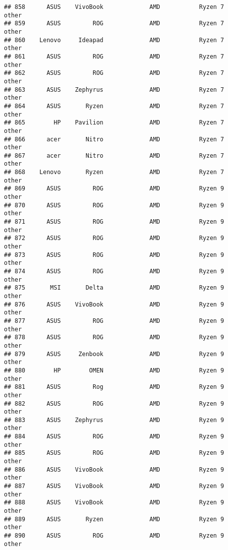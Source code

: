 \documentclass[
]{article}
\begin{document}
\begin{verbatim}
## 858      ASUS    VivoBook             AMD           Ryzen 7           other
## 859      ASUS         ROG             AMD           Ryzen 7           other
## 860    Lenovo     Ideapad             AMD           Ryzen 7           other
## 861      ASUS         ROG             AMD           Ryzen 7           other
## 862      ASUS         ROG             AMD           Ryzen 7           other
## 863      ASUS    Zephyrus             AMD           Ryzen 7           other
## 864      ASUS       Ryzen             AMD           Ryzen 7           other
## 865        HP    Pavilion             AMD           Ryzen 7           other
## 866      acer       Nitro             AMD           Ryzen 7           other
## 867      acer       Nitro             AMD           Ryzen 7           other
## 868    Lenovo       Ryzen             AMD           Ryzen 7           other
## 869      ASUS         ROG             AMD           Ryzen 9           other
## 870      ASUS         ROG             AMD           Ryzen 9           other
## 871      ASUS         ROG             AMD           Ryzen 9           other
## 872      ASUS         ROG             AMD           Ryzen 9           other
## 873      ASUS         ROG             AMD           Ryzen 9           other
## 874      ASUS         ROG             AMD           Ryzen 9           other
## 875       MSI       Delta             AMD           Ryzen 9           other
## 876      ASUS    VivoBook             AMD           Ryzen 9           other
## 877      ASUS         ROG             AMD           Ryzen 9           other
## 878      ASUS         ROG             AMD           Ryzen 9           other
## 879      ASUS     Zenbook             AMD           Ryzen 9           other
## 880        HP        OMEN             AMD           Ryzen 9           other
## 881      ASUS         Rog             AMD           Ryzen 9           other
## 882      ASUS         ROG             AMD           Ryzen 9           other
## 883      ASUS    Zephyrus             AMD           Ryzen 9           other
## 884      ASUS         ROG             AMD           Ryzen 9           other
## 885      ASUS         ROG             AMD           Ryzen 9           other
## 886      ASUS    VivoBook             AMD           Ryzen 9           other
## 887      ASUS    VivoBook             AMD           Ryzen 9           other
## 888      ASUS    VivoBook             AMD           Ryzen 9           other
## 889      ASUS       Ryzen             AMD           Ryzen 9           other
## 890      ASUS         ROG             AMD           Ryzen 9           other

\end{verbatim}
\end{document}
